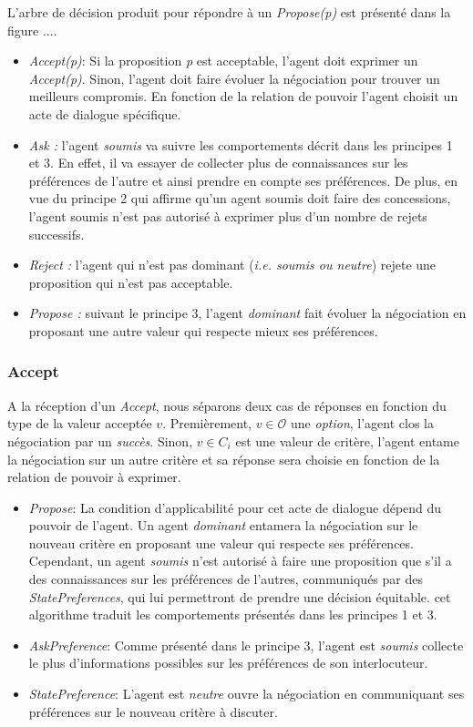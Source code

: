 	
	L'arbre de décision produit pour répondre à un \emph{Propose(p)} est présenté dans la figure .... 
	\begin{itemize}
		
		\item  \emph{Accept(p)}: Si la proposition \emph{p} est acceptable, l'agent doit exprimer un \emph{Accept(p)}. Sinon, l'agent doit faire évoluer la négociation pour trouver un meilleurs compromis. En fonction de la relation de pouvoir l'agent choisit un acte de dialogue spécifique.
		\item \emph{Ask :} l'agent \emph{soumis} va suivre les comportements décrit dans les principes 1 et 3. En effet, il va essayer de collecter plus de connaissances sur les préférences de l'autre et ainsi prendre en compte ses préférences. De plus, en vue du principe 2 qui affirme qu'un agent soumis doit faire des concessions, l'agent soumis n'est pas autorisé à exprimer plus d'un nombre de rejets successifs.  
		\item \emph{Reject :} l'agent qui n'est pas dominant (\emph{i.e. soumis ou neutre}) rejete une proposition qui n'est pas acceptable.
		\item \emph{Propose :} suivant le principe 3, l'agent \emph{dominant} fait évoluer la négociation en proposant une autre valeur qui respecte mieux ses préférences. 
	\end{itemize}
	
	
	
	\subsubsection{Accept }
	A la réception	d'un \emph{Accept}, nous séparons deux cas de réponses en fonction du type de la valeur acceptée $v$.
	Premièrement, $ v \in \mathcal{O}$ une \textit{option}, l'agent clos la négociation par un \emph{succès}.
	Sinon, $v \in C_i$ est une valeur de critère, l'agent entame la négociation sur un autre critère et sa réponse sera choisie en fonction de la relation de pouvoir à exprimer.
	
	\begin{itemize}
		\item \emph{Propose}: La condition d'applicabilité pour cet acte de dialogue dépend du pouvoir de l'agent. Un agent \emph{dominant} entamera la négociation sur le nouveau critère en proposant une valeur qui respecte ses préférences. Cependant, un agent \emph{soumis} n'est autorisé à faire une proposition que s'il a des connaissances sur les préférences de l'autres,  communiqués par des \emph{StatePreferences}, qui lui permettront de prendre une décision équitable. cet algorithme traduit les comportements présentés dans les principes 1 et 3. 
		
		\item \emph{AskPreference}: Comme présenté dans le principe 3, l'agent est \emph{soumis} collecte le plus d'informations possibles sur les préférences de son interlocuteur. 
		\item \emph{StatePreference}: L'agent est \emph{neutre} ouvre la négociation en communiquant ses préférences sur le nouveau critère à discuter. 
		
	\end{itemize}
	
